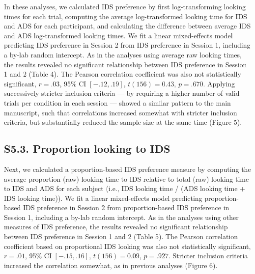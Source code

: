 \documentclass[
  man, donotrepeattitle,floatsintext]{apa6}
\begin{document}
In these analyses, we calculated IDS preference by first log-transforming looking times for each trial, computing the average log-transformed looking time for IDS and ADS for each participant, and calculating the difference between average IDS and ADS log-transformed looking times.
We fit a linear mixed-effects model predicting IDS preference in Session 2 from IDS preference in Session 1, including a by-lab random intercept.
As in the analyses using average raw looking times, the results revealed no significant relationship between IDS preference in Session 1 and 2 (Table 4).
The Pearson correlation coefficient was also not statistically significant, \(r = .03\), 95\% CI \([-.12, .19]\), \(t(156) = 0.43\), \(p = .670\).
Applying successively stricter inclusion criteria --- by requiring a higher number of valid trials per condition in each session --- showed a similar pattern to the main manuscript, such that correlations increased somewhat with stricter inclusion criteria, but substantially reduced the sample size at the same time (Figure 5).

\hypertarget{s5.3.-proportion-looking-to-ids}{%
\subsection{S5.3. Proportion looking to IDS}\label{s5.3.-proportion-looking-to-ids}}

Next, we calculated a proportion-based IDS preference measure by computing the average proportion (raw) looking time to IDS relative to total (raw) looking time to IDS and ADS for each subject (i.e., IDS looking time / (ADS looking time + IDS looking time)).
We fit a linear mixed-effects model predicting proportion-based IDS preference in Session 2 from proportion-based IDS preference in Session 1, including a by-lab random intercept.
As in the analyses using other measures of IDS preference, the results revealed no significant relationship between IDS preference in Session 1 and 2 (Table 5).
The Pearson correlation coefficient based on proportional IDS looking was also not statistically significant, \(r = .01\), 95\% CI \([-.15, .16]\), \(t(156) = 0.09\), \(p = .927\).
Stricter inclusion criteria increased the correlation somewhat, as in previous analyses (Figure 6).
\end{document}
